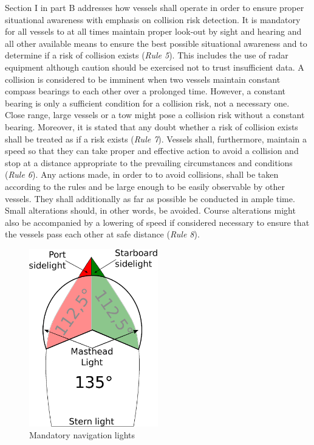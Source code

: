 Section I in part B addresses how vessels shall operate in order to ensure proper situational awareness with emphasis on collision risk detection.
It is mandatory for  all vessels to at all times maintain proper look-out by sight and hearing and all other available means to ensure the best possible situational awareness and  to determine if a risk of collision exists (\textit{Rule 5}).
This includes the use of radar equipment although caution should be exercised not to trust insufficient data. 
A collision is considered to be imminent when two vessels maintain constant compass bearings to each other over a prolonged time.
However, a constant bearing is only a sufficient condition for a collision risk, not a necessary one. Close range, large vessels or a tow might pose a collision risk without a constant bearing. Moreover, it is stated that any doubt whether a risk of collision exists shall be treated as if a risk exists (\textit{Rule 7}).
Vessels shall, furthermore, maintain a speed so that they can take proper and effective action to avoid a collision and stop at a distance appropriate to the prevailing circumstances and conditions (\textit{Rule 6}). Any actions made, in order to to avoid collisions, shall be taken according to the rules and be large enough to be easily observable by other vessels. They shall additionally as far as possible be conducted in ample time. Small alterations should, in other words, be avoided. Course alterations might also be accompanied by a lowering of speed if considered necessary to ensure that the vessels pass each other at safe distance (\textit{Rule 8}).
\begin{figure}
    \centering
    \includegraphics[width=0.5\textwidth,height=0.5\textheight,keepaspectratio]{Figures/lights.eps}
    \caption{Mandatory navigation lights}
    \label{fig:nav_lights}
\end{figure}



